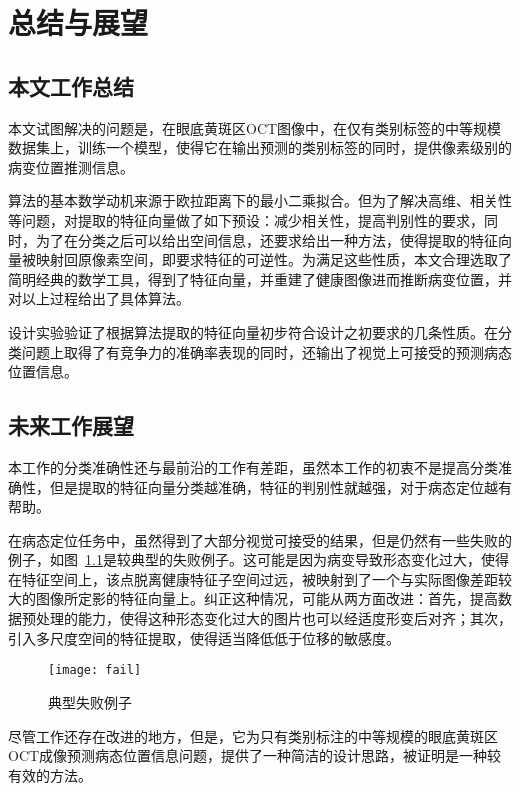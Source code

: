 \chapter{总结与展望}

\section{本文工作总结}
    本文试图解决的问题是，在眼底黄斑区OCT图像中，在仅有类别标签的中等规模数据集上，训练一个模型，使得它在输出预测的类别标签的同时，提供像素级别的病变位置推测信息。

    算法的基本数学动机来源于欧拉距离下的最小二乘拟合。但为了解决高维、相关性等问题，对提取的特征向量做了如下预设：减少相关性，提高判别性的要求，同时，为了在分类之后可以给出空间信息，还要求给出一种方法，使得提取的特征向量被映射回原像素空间，即要求特征的可逆性。为满足这些性质，本文合理选取了简明经典的数学工具，得到了特征向量，并重建了健康图像进而推断病变位置，并对以上过程给出了具体算法。

    设计实验验证了根据算法提取的特征向量初步符合设计之初要求的几条性质。在分类问题上取得了有竞争力的准确率表现的同时，还输出了视觉上可接受的预测病态位置信息。


\section{未来工作展望}
    本工作的分类准确性还与最前沿的工作有差距，虽然本工作的初衷不是提高分类准确性，但是提取的特征向量分类越准确，特征的判别性就越强，对于病态定位越有帮助。

    在病态定位任务中，虽然得到了大部分视觉可接受的结果，但是仍然有一些失败的例子，如图~\ref{fig:fail}是较典型的失败例子。这可能是因为病变导致形态变化过大，使得在特征空间上，该点脱离健康特征子空间过远，被映射到了一个与实际图像差距较大的图像所定影的特征向量上。纠正这种情况，可能从两方面改进：首先，提高数据预处理的能力，使得这种形态变化过大的图片也可以经适度形变后对齐；其次，引入多尺度空间的特征提取，使得适当降低低于位移的敏感度。
    \begin{figure}[H] %
      \centering
      \texttt{[image: fail]}
      \caption{典型失败例子}
      \label{fig:fail}
    \end{figure}


    尽管工作还存在改进的地方，但是，它为只有类别标注的中等规模的眼底黄斑区OCT成像预测病态位置信息问题，提供了一种简洁的设计思路，被证明是一种较有效的方法。

